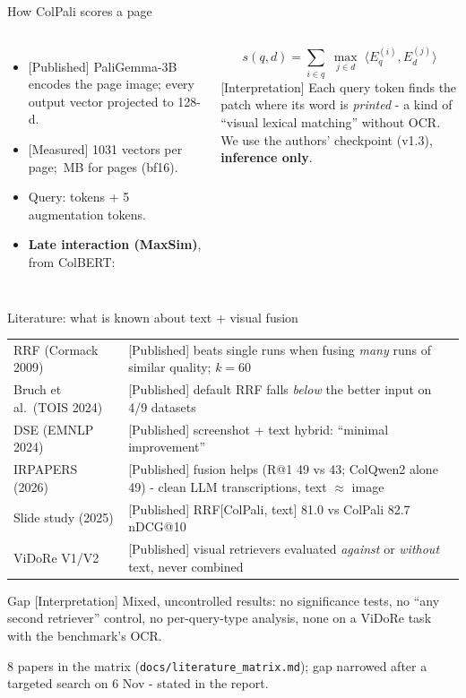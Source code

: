 \documentclass[aspectratio=169,11pt]{beamer}
\newcommand{\lbl}[2]{\textsf{\scriptsize\textcolor{#1}{[#2]}}}
\newcommand{\Pub}{\lbl{cpBlue}{Published}}
\newcommand{\Mea}{\lbl{bgAqua}{Measured}}
\newcommand{\Int}{\lbl{tagI}{Interpretation}}
\begin{document}
\begin{frame}{How ColPali scores a page}
\begin{columns}[c]
\begin{itemize}
  \item \Pub{} PaliGemma-3B encodes the page image; every output vector projected to 128-d.
  \item \Mea{} 1031 vectors per page; \sizeB{}\,MB for \nPages{} pages (bf16).
  \item Query: tokens + 5 augmentation tokens.
  \item \textbf{Late interaction (MaxSim)}, from ColBERT:
\end{itemize}
\[
s(q,d)=\sum_{i \in q}\;\max_{j \in d}\;\langle E_q^{(i)},E_d^{(j)}\rangle
\]
\small
\Int{} Each query token finds the patch where its word is \emph{printed} - a kind of ``visual lexical matching'' without OCR.\\[6pt]
We use the authors' checkpoint (v1.3), \textbf{inference only}.
\end{columns}
\end{frame}

\begin{frame}{Literature: what is known about text + visual fusion}
\small
\begin{tabular}{@{}p{3.2cm}p{9.6cm}@{}}
\toprule
RRF (Cormack 2009) & \Pub{} beats single runs when fusing \emph{many} runs of similar quality; $k{=}60$\\
Bruch et al.\ (TOIS 2024) & \Pub{} default RRF falls \emph{below} the better input on 4/9 datasets\\
DSE (EMNLP 2024) & \Pub{} screenshot + text hybrid: ``minimal improvement''\\
IRPAPERS (2026) & \Pub{} fusion helps (R@1 49 vs 43; ColQwen2 alone 49) - clean LLM transcriptions, text $\approx$ image\\
Slide study (2025) & \Pub{} RRF[ColPali, text] 81.0 vs ColPali 82.7 nDCG@10\\
ViDoRe V1/V2 & \Pub{} visual retrievers evaluated \emph{against} or \emph{without} text, never combined\\
\bottomrule
\end{tabular}
\vspace{0.8em}
\begin{block}{Gap \Int{}}
Mixed, uncontrolled results: no significance tests, no ``any second retriever'' control, no per-query-type analysis, none on a ViDoRe task with the benchmark's OCR.
\end{block}
\footnotesize\textcolor{muted}{8 papers in the matrix (\texttt{docs/literature\_matrix.md}); gap narrowed after a targeted search on 6 Nov - stated in the report.}
\end{frame}
\end{document}
